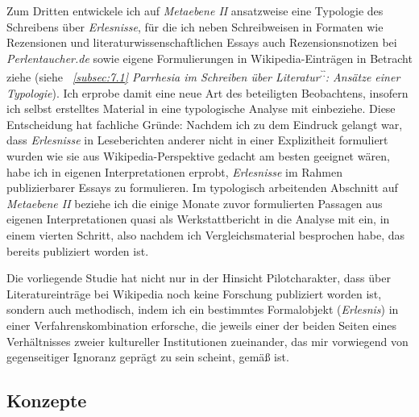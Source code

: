 \documentclass[fontsize=12pt]{scrartcl}
\begin{document}
Zum Dritten entwickele ich auf \textit{Metaebene II} ansatzweise eine Typologie des Schrei\-bens \"uber \textit{Erlesnisse}, f\"ur die ich neben Schreibweisen in Formaten wie Rezensionen und li\-te\-ra\-tur\-wissenschaftlichen Essays auch Rezensionsnotizen bei \textit{Per\-len\-tau\-cher.de} sowie eigene Formulierungen in Wi\-ki\-pe\-dia-Eintr\"agen in Betracht ziehe (siehe \textit{~\ref{subsec:7.1} \textit{Parrhesia} im Schrei\-ben \"uber Li\-te\-ra\-tur\textsuperscript{\~.\~.}: Ans\"atze einer Typologie}). Ich erprobe damit eine neue Art des beteiligten Beobachtens, insofern ich \mbox{selbst} erstelltes Material in eine typologische Ana\-lyse mit einbeziehe. Diese Entscheidung hat fachliche Gr\"unde: Nachdem ich zu dem Eindruck gelangt war, dass \textit{Erlesnisse} in Leseberichten an\-de\-rer nicht in einer Explizitheit formuliert wurden wie sie aus Wi\-ki\-pe\-dia-Perspektive gedacht am besten ge\-eig\-net w\"aren, habe ich in eigenen Interpretationen erprobt, \textit{Erlesnisse} im Rahmen pu\-bli\-zierbarer Essays zu formulieren. Im typologisch arbei\-tenden Abschnitt auf \textit{Metaebene II} beziehe ich die einige Monate zuvor formulierten Passagen aus eigenen Interpretationen quasi als Werkstattbericht in die Ana\-lyse mit ein, in einem vierten Schritt, also nachdem ich Vergleichsmaterial besprochen habe, das bereits pu\-bli\-ziert worden ist. 

Die vorliegende Studie hat nicht nur in der Hinsicht Pilot\textsuperscript{\tiny *}charakter, dass \"uber Li\-te\-ra\-tur\-eintr\"age bei Wi\-ki\-pe\-dia noch keine For\-schung pu\-bli\-ziert worden ist, sondern auch methodisch, indem ich ein be\-stimmtes Formalobjekt (\textit{Erlesnis}) in einer Verfah\-rens\-kombination erforsche, die jeweils einer der beiden Seiten eines Verh\"altnisses zweier kultureller Institutionen zueinander, das mir vorwiegend von gegenseitiger Ignoranz gepr\"agt zu sein scheint, gem\"a{\ss} ist.

\subsection{Konzepte}
\label{subsec:2.7}
\end{document}
